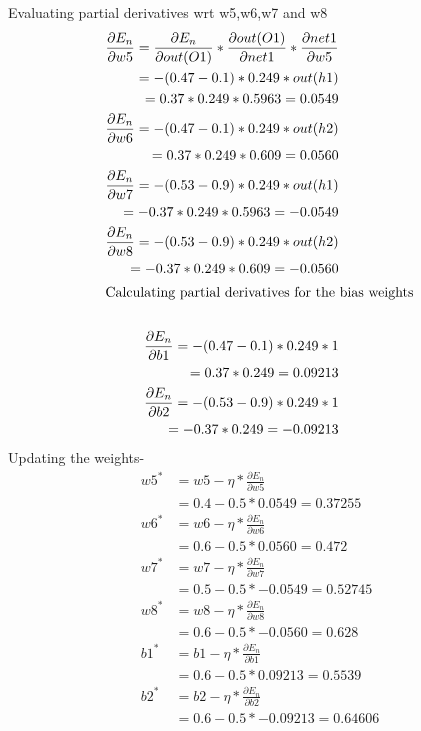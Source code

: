 \documentclass[12pt]{article}
\begin{document}
Evaluating partial derivatives wrt w5,w6,w7 and w8
\begin{align*}
    \frac{\partial E_n}{\partial w5}=\frac{\partial E_n}{\partial out(O1)}*\frac{\partial out(O1)}{\partial net1} * \frac{\partial net1}{\partial w5}\\
    =-(0.47-0.1)*0.249*out(h1)\\
    =0.37*0.249*0.5963=0.0549\\
    \frac{\partial E_n}{\partial w6}
    =-(0.47-0.1)*0.249*out(h2)\\
    =0.37*0.249*0.609=0.0560\\
    \frac{\partial E_n}{\partial w7}
    =-(0.53-0.9)*0.249*out(h1)\\
    =-0.37*0.249*0.5963=-0.0549\\
    \frac{\partial E_n}{\partial w8}
    =-(0.53-0.9)*0.249*out(h2)\\
    =-0.37*0.249*0.609=-0.0560\\
    \intertext{Calculating partial derivatives for the bias weights}\\
    \frac{\partial E_n}{\partial b1}
    =-(0.47-0.1)*0.249*1\\
    =0.37*0.249=0.09213\\
    \frac{\partial E_n}{\partial b2}
    =-(0.53-0.9)*0.249*1\\
    =-0.37*0.249=-0.09213\\
\end{align*}
Updating the weights-
\begin{align*}
    w5^{*}
    &=w5-\eta * \frac{\partial E_n}{\partial w5}\\
    &=0.4-0.5*0.0549=0.37255\\
    w6^{*}
    &=w6-\eta * \frac{\partial E_n}{\partial w6}\\
    &=0.6-0.5*0.0560=0.472\\
    w7^{*}
    &=w7-\eta * \frac{\partial E_n}{\partial w7}\\
    &=0.5-0.5*-0.0549=0.52745\\
    w8^{*}
    &=w8-\eta * \frac{\partial E_n}{\partial w8}\\
    &=0.6-0.5*-0.0560=0.628\\
    b1^{*}
    &=b1-\eta * \frac{\partial E_n}{\partial b1}\\
    &=0.6-0.5*0.09213=0.5539\\
    b2^{*}
    &=b2-\eta * \frac{\partial E_n}{\partial b2}\\
    &=0.6-0.5*-0.09213=0.64606
\end{align*}
\end{document}
